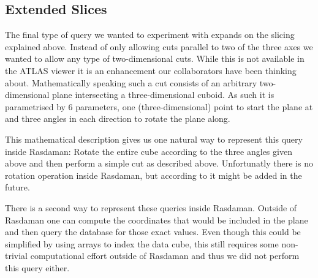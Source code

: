 \subsection{Extended Slices}

The final type of query we wanted to experiment with expands on the slicing explained above. Instead of only allowing cuts parallel to two of the three axes we wanted to allow any type of two-dimensional cuts. While this is not available in the ATLAS viewer it is an enhancement our collaborators have been thinking about. Mathematically speaking such a cut consists of an arbitrary two-dimensional plane intersecting a three-dimensional cuboid. As such it is parametrised by 6 parameters, one (three-dimensional) point to start the plane at and three angles in each direction to rotate the plane along.

This mathematical description gives us one natural way to represent this query inside Rasdaman: Rotate the entire cube according to the three angles given above and then perform a simple cut as described above. Unfortunatly there is no rotation operation inside Rasdaman, but according to \cite{rasdaman:issue228} it might be added in the future.

There is a second way to represent these queries inside Rasdaman. Outside of Rasdaman one can compute the coordinates that would be included in the plane and then query the database for those exact values. Even though this could be simplified by using arrays to index the data cube, this still requires some non-trivial computational effort outside of Rasdaman and thus we did not perform this query either.
